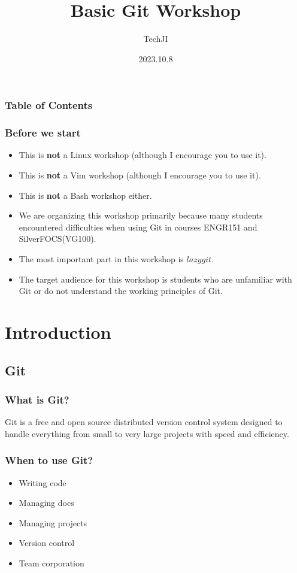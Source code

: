 \documentclass[aspectratio=169]{beamer}
\title[Course number]{Basic Git Workshop}
\author[]{TechJI}
\institute[UMJI-SJTU]
{
	University of Michigan - Shanghai Jiaotong University
	\\\medskip
	Joint Institute
}
\date{2023.10.8}
\begin{document}
\maketitle
\begin{frame}
  \frametitle{Table of Contents}
  \tableofcontents
\end{frame}

\begin{frame}
  \frametitle{Before we start}
  \begin{itemize}
      \item This is \textbf{not} a Linux workshop
          (although I encourage you to use it).
      \item This is \textbf{not} a Vim workshop
          (although I encourage you to use it).
      \item This is \textbf{not} a Bash workshop either.
      \item We are organizing this workshop primarily because many students encountered difficulties when using Git in courses ENGR151 and SilverFOCS(VG100).
      \item The most important part in this workshop is $lazygit$.
      \item The target audience for this workshop is students who are unfamiliar with Git or do not understand the working principles of Git.
  \end{itemize}
\end{frame}

\section{Introduction}
\subsection{Git}
\begin{frame}
  \frametitle{What is Git?}
  Git is a free and open source distributed version control system designed to handle everything from small to very large projects with speed and efficiency.
\end{frame}

\begin{frame}
  \frametitle{When to use Git?}

  \begin{itemize}
    \item Writing code
    \item Managing docs
    \item Managing projects
    \item Version control
    \item Team corporation
  \end{itemize}

\end{frame}
\end{document}

